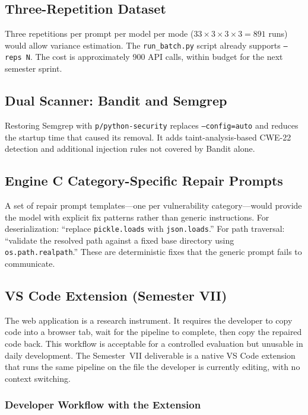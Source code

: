 \documentclass[12pt,a4paper]{report}
\begin{document}
\subsection{Three-Repetition Dataset}

Three repetitions per prompt per model per mode ($33 \times 3 \times 3 \times 3
= 891$ runs) would allow variance estimation. The \texttt{run\_batch.py} script
already supports \texttt{--reps N}. The cost is approximately 900 API calls,
within budget for the next semester sprint.

\subsection{Dual Scanner: Bandit and Semgrep}

Restoring Semgrep with \texttt{p/python-security} replaces \texttt{--config=auto}
and reduces the startup time that caused its removal. It adds taint-analysis-based
CWE-22 detection and additional injection rules not covered by Bandit alone.

\subsection{Engine C Category-Specific Repair Prompts}

A set of repair prompt templates---one per vulnerability category---would provide
the model with explicit fix patterns rather than generic instructions. For
deserialization: ``replace \texttt{pickle.loads} with \texttt{json.loads}.'' For
path traversal: ``validate the resolved path against a fixed base directory using
\texttt{os.path.realpath}.'' These are deterministic fixes that the generic prompt
fails to communicate.

\subsection{VS Code Extension (Semester VII)}
\label{sec:vscode}

The web application is a research instrument. It requires the developer to copy
code into a browser tab, wait for the pipeline to complete, then copy the repaired
code back. This workflow is acceptable for a controlled evaluation but unusable
in daily development. The Semester~VII deliverable is a native VS Code extension
that runs the same pipeline on the file the developer is currently editing, with
no context switching.

\subsubsection{Developer Workflow with the Extension}
\end{document}
